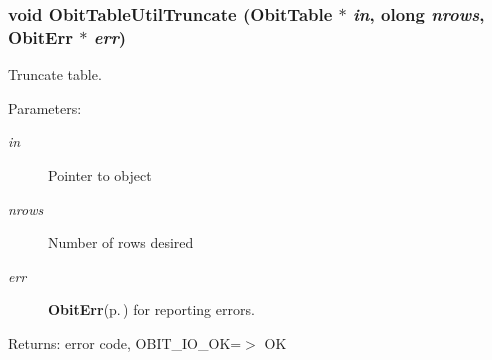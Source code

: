 \subsubsection{\setlength{\rightskip}{0pt plus 5cm}void Obit\-Table\-Util\-Truncate ({\bf Obit\-Table} $\ast$ {\em in}, {\bf olong} {\em nrows}, {\bf Obit\-Err} $\ast$ {\em err})}\label{ObitTableUtil_8h_a3}


Truncate table. 

\begin{Desc}
\item[Parameters:]
\begin{description}
\item[{\em in}]Pointer to object \item[{\em nrows}]Number of rows desired \item[{\em err}]{\bf Obit\-Err}{\rm (p.\,\pageref{structObitErr})} for reporting errors. \end{description}
\end{Desc}
\begin{Desc}
\item[Returns:]error code, OBIT\_\-IO\_\-OK=$>$ OK \end{Desc}
